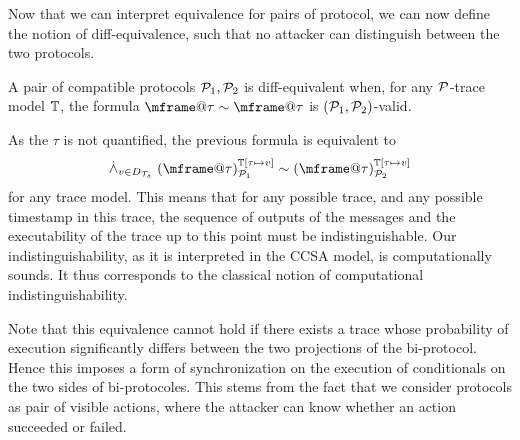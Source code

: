 Now that we can interpret equivalence for pairs of protocol, we can now define the notion of diff-equivalence, such that no attacker can distinguish between the two protocols.

\begin{definition}
  \label{def:process-equiv}
  A pair of compatible protocols $\mathcal{P}_1,\mathcal{P}_2$ is diff-equivalent when,
  for any $\mathcal{P}$-trace model $\mathbb{T}$, the formula $\mframe@\tau  \sim \mframe@\tau$ is $(\mathcal{P}_1,\mathcal{P}_2)$-valid.
\end{definition}

As the $\tau$ is not quantified, the previous formula is equivalent to  \[
    \dand_{v\in D_\XT}
    \interp{\mframe@\tau}{\TM[\tau\mapsto v]}{\calp_1}
    \sim
    \interp{\mframe@\tau}{\TM[\tau \mapsto v]}{\calp_2}
  \]
  for any trace model. This means that for any possible trace, and any possible timestamp in this trace, the sequence of outputs of the messages and the executability of the trace up to this point must be indistinguishable. Our indistinguishability, as it is interpreted in the CCSA model, is computationally sounds. It thus corresponds to the classical notion of computational indistinguishability.

Note that this equivalence cannot hold if there exists a trace whose probability
of execution significantly differs between the two projections of the
bi-protocol. Hence this imposes a form of synchronization on the execution of
conditionals on the two sides of bi-protocoles. This stems from the fact that we
consider protocols as pair of visible actions, where the attacker can know
whether an action succeeded or failed.




